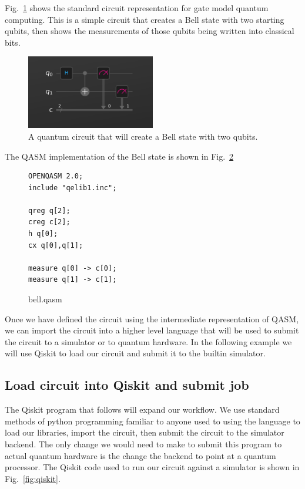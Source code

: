 \documentclass[conference]{IEEEtran}
\begin{document}
Fig.~\ref{fig:bell} shows the standard circuit representation for gate model quantum computing. This is a simple circuit that creates a Bell state with two starting qubits, then shows the measurements of those qubits being written into classical bits. 
\begin{figure}[H]
    \centering
    \includegraphics[width=0.5\textwidth]{circuit.png}
    \caption{A quantum circuit that will create a Bell state with two qubits.}
    \label{fig:bell}
\end{figure}

The QASM implementation of the Bell state is shown in Fig.~\ref{fig:qasm}
\begin{samepage}
\begin{figure}[htbp]
\begin{verbatim}
OPENQASM 2.0;
include "qelib1.inc";

qreg q[2];
creg c[2];
h q[0];
cx q[0],q[1];
  
measure q[0] -> c[0];
measure q[1] -> c[1];
\end{verbatim}
\caption{bell.qasm}
\label{fig:qasm}
\end{figure}
\end{samepage}

Once we have defined the circuit using the intermediate representation of QASM, we can import the circuit into a higher level language that will be used to submit the circuit to a simulator or to quantum hardware. In the following example we will use Qiskit to load our circuit and submit it to the builtin simulator.

\subsection{Load circuit into Qiskit and submit job}

The Qiskit program that follows will expand our workflow. We use standard methods of python programming familiar to anyone used to using the language to load our libraries, import the circuit, then submit the circuit to the simulator backend. The only change we would need to make to submit this program to actual quantum hardware is the change the backend to point at a quantum processor. The Qiskit code used to run our circuit against a simulator is shown in Fig.~\ref{fig:qiskit}.
\end{document}
